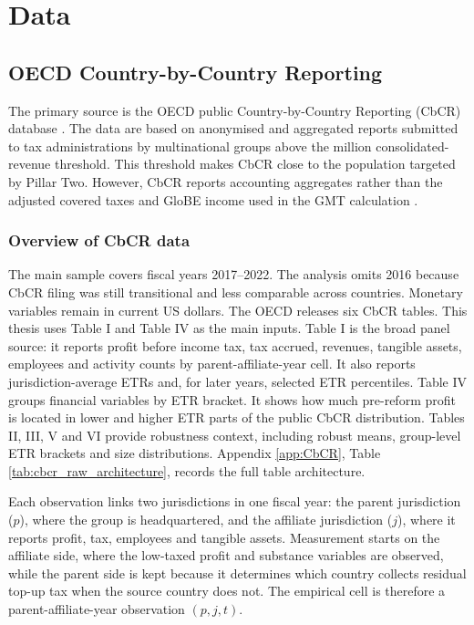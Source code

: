 \documentclass[11pt,a4paper]{article}
\newcommand{\EUR}{\texteuro}
\begin{document}
\section{Data}\label{data}\label{sec:data}\label{sec:descriptive}

\subsection{OECD Country-by-Country Reporting}\label{sec:CbCR}

The primary source is the OECD public Country-by-Country Reporting (CbCR) database \citep{oecd2025a}. The data are based on anonymised and aggregated reports submitted to tax administrations by multinational groups above the \EUR 750 million consolidated-revenue threshold. This threshold makes CbCR close to the population targeted by Pillar Two. However, CbCR reports accounting aggregates rather than the adjusted covered taxes and GloBE income used in the GMT calculation \citep{oecd2025,hanlon2023}.

\subsubsection{Overview of CbCR data}\label{sec:CbCR_overview}

The main sample covers fiscal years 2017--2022. The analysis omits 2016 because CbCR filing was still transitional and less comparable across countries. Monetary variables remain in current US dollars. The OECD releases six CbCR tables. This thesis uses Table I and Table IV as the main inputs. Table I is the broad panel source: it reports profit before income tax, tax accrued, revenues, tangible assets, employees and activity counts by parent-affiliate-year cell. It also reports jurisdiction-average ETRs and, for later years, selected ETR percentiles. Table IV groups financial variables by ETR bracket. It shows how much pre-reform profit is located in lower and higher ETR parts of the public CbCR distribution. Tables II, III, V and VI provide robustness context, including robust means, group-level ETR brackets and size distributions. Appendix \ref{app:CbCR}, Table \ref{tab:cbcr_raw_architecture}, records the full table architecture.

Each observation links two jurisdictions in one fiscal year: the parent jurisdiction ($p$), where the group is headquartered, and the affiliate jurisdiction ($j$), where it reports profit, tax, employees and tangible assets. Measurement starts on the affiliate side, where the low-taxed profit and substance variables are observed, while the parent side is kept because it determines which country collects residual top-up tax when the source country does not. The empirical cell is therefore a parent-affiliate-year observation $(p,j,t)$.
\end{document}
